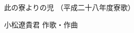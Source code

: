 \documentclass[10pt,b5j]{tarticle} %
\begin{document}
\begin{minipage}[c]{0.7\hsize} %
    \begin{center}
        {\LARGE
            此の寮よりの児 %
        }
        {\small 
            （平成二十八年度寮歌） %
        }
    \end{center}
\end{minipage}
\begin{minipage}[c]{0.3\hsize} %
    \begin{flushright} %
        小松遼貴君 作歌・作曲 %
    \end{flushright}
\end{minipage}
\end{document}
